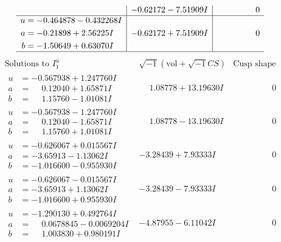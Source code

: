 \documentclass[1p]{elsarticle_modified}
\theoremstyle{definition}
\newcommand{\I}{\sqrt{-1}}
\begin{document}
$$\begin{array}{c|c|c}
 & -0.62172 - 7.51909 I & \phantom{-0.000000 } 0 \\ \hline\begin{aligned}
u &= -0.464878 - 0.432268 I \\
a &= -0.21898 + 2.56225 I \\
b &= -1.50649 + 0.63070 I\end{aligned}
 & -0.62172 + 7.51909 I & \phantom{-0.000000 } 0\\
 \hline 
 \end{array}$$\newpage$$\begin{array}{c|c|c}  
\text{Solutions to }I^u_{1}& \I (\text{vol} + \sqrt{-1}CS) & \text{Cusp shape}\\
 \hline 
\begin{aligned}
u &= -0.567938 + 1.247760 I \\
a &= \phantom{-}0.12040 + 1.65871 I \\
b &= \phantom{-}1.15760 - 1.01081 I\end{aligned}
 & \phantom{-}1.08778 + 13.19630 I & \phantom{-0.000000 } 0 \\ \hline\begin{aligned}
u &= -0.567938 - 1.247760 I \\
a &= \phantom{-}0.12040 - 1.65871 I \\
b &= \phantom{-}1.15760 + 1.01081 I\end{aligned}
 & \phantom{-}1.08778 - 13.19630 I & \phantom{-0.000000 } 0 \\ \hline\begin{aligned}
u &= -0.626067 + 0.015567 I \\
a &= -3.65913 - 1.13062 I \\
b &= -1.016600 - 0.955930 I\end{aligned}
 & -3.28439 + 7.93333 I & \phantom{-0.000000 } 0 \\ \hline\begin{aligned}
u &= -0.626067 - 0.015567 I \\
a &= -3.65913 + 1.13062 I \\
b &= -1.016600 + 0.955930 I\end{aligned}
 & -3.28439 - 7.93333 I & \phantom{-0.000000 } 0 \\ \hline\begin{aligned}
u &= -1.290130 + 0.492764 I \\
a &= \phantom{-}0.0678845 - 0.0069204 I \\
b &= \phantom{-}1.003830 + 0.980191 I\end{aligned}
 & -4.87955 - 6.11042 I & \phantom{-0.000000 } 0 \\ \hline\begin{aligned}

\end{aligned}
\end{array}$$
\end{document}
